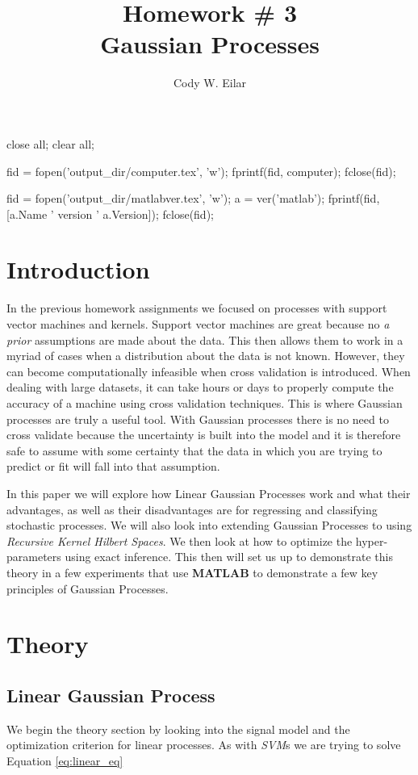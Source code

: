\documentclass[11pt, twoside]{article}   	%
\title{Homework \# 3 \\ Gaussian Processes}
\author{Cody W. Eilar}
\newenvironment{matlab}{\comment}{\endcomment}
\begin{document}
\maketitle


\begin{matlab}
close all; 
clear all;

fid = fopen('output_dir/computer.tex', 'w'); 
fprintf(fid, computer); 
fclose(fid); 

fid = fopen('output_dir/matlabver.tex', 'w'); 
a = ver('matlab'); 
fprintf(fid, [a.Name ' version ' a.Version]); 
fclose(fid); 
\end{matlab}

\section{Introduction} 
In the previous homework assignments we focused on processes with support vector machines
and kernels. Support vector machines are great because no \textit{a prior} assumptions
are made about the data. This then allows them to work in a myriad of cases when a
distribution about the data is not known. However, they can become computationally 
infeasible when cross validation is introduced. When dealing with large datasets, it can
take hours or days to properly compute the accuracy of a machine using cross validation 
techniques. This is where Gaussian processes are truly a useful tool. With Gaussian processes
there is no need to cross validate because the uncertainty is built into the model and it 
is therefore safe to assume with some certainty that the data in which you are trying to 
predict or fit will fall into that assumption.

In this paper we will explore how Linear Gaussian Processes work and what their advantages, 
as well as their disadvantages are for regressing and classifying stochastic processes. 
We will also look into extending Gaussian Processes to using \textit{Recursive Kernel Hilbert
Spaces}. We then look at how to optimize the hyper-parameters using exact inference. 
This then will set us up to demonstrate this theory in a few experiments that use
\textbf{MATLAB} to demonstrate a few key principles of Gaussian Processes. 
\section{Theory}
\subsection{Linear Gaussian Process}
We begin the theory section by looking into the signal model and the optimization criterion
for linear processes. As with \textit{SVM}s we are trying to solve Equation \ref{eq:linear_eq}
\end{document}

